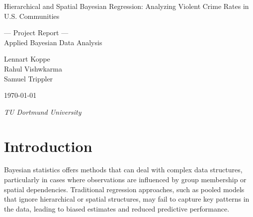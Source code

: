 \documentclass[12pt]{article}
\begin{document}
    \begin{titlepage}
        \centering %
        \vspace*{\baselineskip} %
        
        {\huge Hierarchical and Spatial Bayesian Regression: Analyzing Violent Crime Rates in U.S. Communities}\\[0.2\baselineskip] %
        
        
        \vspace*{\baselineskip}
        
        {\Large --- Project Report ---\\
          Applied Bayesian Data Analysis\\[\baselineskip]} %
        \vspace*{\baselineskip}
        
        {\LARGE Lennart Koppe
        \\ Rahul Vishwkarma \\
        Samuel Trippler \\[\baselineskip]} %
        
        \vspace*{\baselineskip}

        \vfill
        
        \today \par %
        
        \vspace*{\baselineskip}

        {\itshape TU Dortmund University\par} %
    \end{titlepage}

\clearpage

\newpage

\tableofcontents
\thispagestyle{empty}
\newpage 
\setcounter{page}{1}
\section{Introduction}

Bayesian statistics offers methods that can deal with complex data structures, particularly in cases where observations are influenced by group membership or spatial dependencies. Traditional regression approaches, such as pooled models that ignore hierarchical or spatial structures, may fail to capture key patterns in the data, leading to biased estimates and reduced predictive performance.
\end{document}
